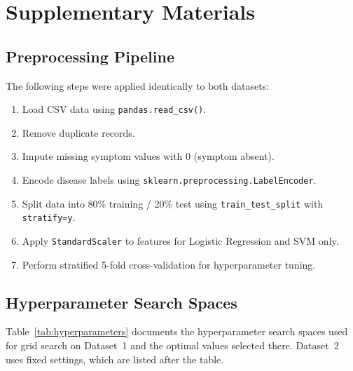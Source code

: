\chapter{Supplementary Materials}
\label{app:supplementary}

\section{Preprocessing Pipeline}
\label{app:preprocessing}

The following steps were applied identically to both datasets:

\begin{enumerate}
    \item Load CSV data using \texttt{pandas.read\_csv()}.
    \item Remove duplicate records.
    \item Impute missing symptom values with 0 (symptom absent).
    \item Encode disease labels using \texttt{sklearn.preprocessing.LabelEncoder}.
    \item Split data into 80\% training / 20\% test using \texttt{train\_test\_split} with \texttt{stratify=y}.
    \item Apply \texttt{StandardScaler} to features for Logistic Regression and SVM only.
    \item Perform stratified 5-fold cross-validation for hyperparameter tuning.
\end{enumerate}

\section{Hyperparameter Search Spaces}
\label{app:hyperparameters}

Table~\ref{tab:hyperparameters} documents the hyperparameter search spaces used for grid search on Dataset~1 and the optimal values selected there. Dataset~2 uses fixed settings, which are listed after the table.

